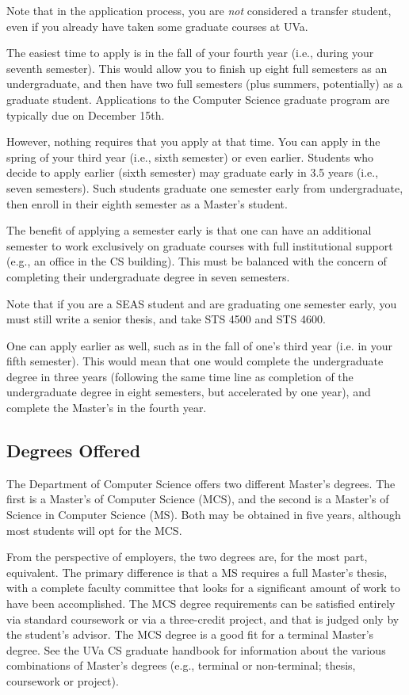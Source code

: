 Note that in the application process, you are \emph{not} considered a
transfer student, even if you already have taken some graduate courses at
UVa.

The easiest time to apply is in the fall of your fourth year (i.e., during
your seventh semester).  This would allow you to finish up eight full
semesters as an undergraduate, and then have two full semesters (plus
summers, potentially) as a graduate student. Applications to the Computer 
Science graduate program are typically due on December
15th. 

However, nothing requires that you apply at that time.  You can apply
in the spring of your third year (i.e., sixth semester) or even earlier.
Students who decide to apply earlier (sixth semester) may graduate
early in 3.5 years (i.e., seven semesters). Such students graduate one
semester early from undergraduate, then enroll in their eighth semester
as a Master's student.

The benefit of applying a semester early is that one can have an
additional semester to work exclusively on graduate courses with full
institutional support (e.g., an office in the CS building). This must be
balanced with the concern of completing their undergraduate degree in seven
semesters.

Note that if you are a SEAS student and are graduating one semester
early, you must still write a senior thesis, and take STS 4500 and STS
4600.

One can apply earlier as well, such as in the fall of one's third year
(i.e. in your fifth semester).  This would mean that one would complete
the undergraduate degree in three years (following the same time line as
completion of the undergraduate degree in eight semesters, but accelerated
by one year), and complete the Master's in the fourth year.

\subsection{Degrees Offered}

The Department of Computer Science offers two different Master's
degrees.  The first is a Master's of Computer Science (MCS), and the
second is a Master's of Science in Computer Science (MS). Both may be
obtained in five years, although most students will opt for the MCS.

From the perspective of employers, the two degrees are, for the most part,
equivalent.  The primary difference is that a MS requires a full
Master's thesis, with a complete faculty committee that looks for a
significant amount of work to have been accomplished.  The MCS degree
requirements can be satisfied entirely via standard coursework or via
a three-credit project, and that is judged only by the student's advisor.
The MCS degree is a good fit for a terminal Master's degree. See the
UVa CS graduate handbook for information about the various combinations
of Master's degrees (e.g., terminal or non-terminal; thesis, coursework or
project). 

